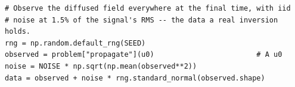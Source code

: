 \begin{verbatim}
# Observe the diffused field everywhere at the final time, with iid
# noise at 1.5% of the signal's RMS -- the data a real inversion holds.
rng = np.random.default_rng(SEED)
observed = problem["propagate"](u0)                        # A u0
noise = NOISE * np.sqrt(np.mean(observed**2))
data = observed + noise * rng.standard_normal(observed.shape)
\end{verbatim}
